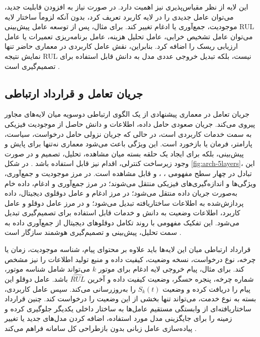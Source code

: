 \documentclass[a4paper,fleqn]{report}
\begin{document}
این لایه از نظر مقیاس‌پذیری نیز اهمیت دارد. در صورت نیاز به افزودن قابلیت جدید، می‌توان عامل جدیدی را در لایه کاربرد تعریف کرد، بدون آنکه لزوماً ساختار لایه موجودیت، جمع‌آوری یا ادغام تغییر کند. برای مثال، پس از توسعه عامل پیش‌بینی \gls{RUL} می‌توان عامل تشخیص خرابی، عامل تحلیل هزینه، عامل برنامه‌ریزی تعمیرات یا عامل ارزیابی ریسک را اضافه کرد. بنابراین، نقش عامل کاربردی در معماری حاضر تنها نمایش نتیجه \gls{RUL} نیست، بلکه تبدیل خروجی عددی مدل به دانش قابل استفاده برای تصمیم‌گیری است \cite{xagentmaint2026}.


\subsection{جریان تعامل و قرارداد ارتباطی}
\label{sec:arch-interaction}

جریان تعامل در معماری پیشنهادی از یک الگوی ارتباطی دوسویه میان لایه‌های مجاور پیروی می‌کند. جریان صعودی حامل داده، اطلاعات و دانش حاصل از موجودیت فیزیکی به سمت خدمات کاربردی است، در حالی که جریان نزولی حامل درخواست، سیاست، پارامتر، فرمان یا بازخورد است. این ویژگی باعث می‌شود معماری نه‌تنها برای پایش و پیش‌بینی، بلکه برای ایجاد یک حلقه بسته میان مشاهده، تحلیل، تصمیم و در صورت وجود زیرساخت کنترلی، اقدام نیز قابل استفاده باشد \cite{tao2019digital,qi2021enabling}. در شکل \ref{fig:arch-5layers}، این تبادل در چهار سطح مفهومی ، ،  و  قابل مشاهده است. در مرز موجودیت و جمع‌آوری، ویژگی‌ها و اندازه‌گیری‌های فیزیکی منتقل می‌شوند؛ در مرز جمع‌آوری و ادغام، داده خام به‌صورت جریان داده منتقل می‌شود؛ در مرز ادغام و عامل دوقلوی دیجیتال، داده پردازش‌شده به اطلاعات ساختاریافته تبدیل می‌شود؛ و در مرز عامل دوقلو و عامل کاربرد، اطلاعات وضعیت به دانش و خدمات قابل استفاده برای تصمیم‌گیری تبدیل می‌شود. این تفکیک مفهومی با روند تکامل دوقلو‌های دیجیتال از جمع‌آوری داده به سمت تحلیل، پیش‌بینی و تصمیم‌گیری هوشمند سازگار است \cite{fuller2020digital,zhou2026dtai,fu2026genaidt}.

قرارداد ارتباطی میان این لایه‌ها باید علاوه بر محتوای پیام، شناسه موجودیت، زمان یا چرخه، نوع درخواست، نسخه وضعیت، کیفیت داده و منبع تولید اطلاعات را نیز مشخص کند. برای مثال، پیام خروجی لایه ادغام برای موتور $k$ می‌تواند شامل شناسه موتور، شماره چرخه، پنجره حسگر، وضعیت کیفیت داده و آخرین $\widehat{RUL}$ باشد. عامل دوقلو این پیام را دریافت کرده و وضعیت $S_k(t)$ را به‌روزرسانی می‌کند. سپس عامل کاربردی، بسته به نوع خدمت، می‌تواند تنها بخشی از این وضعیت را درخواست کند. چنین قرارداد ساختاریافته‌ای از وابستگی مستقیم عامل‌ها به ساختار داخلی یکدیگر جلوگیری کرده و زمینه را برای جایگزینی مدل مورد استفاده، اضافه کردن مدل‌های جدید یا تغییر پیاده‌سازی عامل زبانی بدون بازطراحی کل سامانه فراهم می‌کند \cite{park2026hybriddt}.
\end{document}
